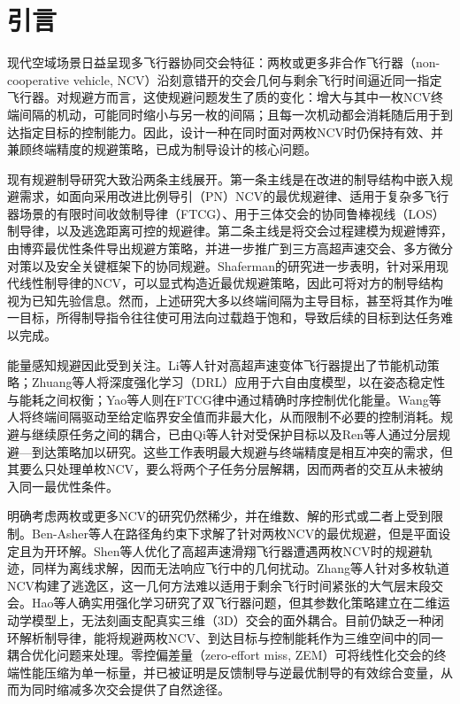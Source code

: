 \section{引言}
现代空域场景日益呈现多飞行器协同交会特征：两枚或更多非合作飞行器（non-cooperative vehicle, NCV）沿刻意错开的交会几何与剩余飞行时间逼近同一指定飞行器\cite{yan2020b,shalumov2019}。对规避方而言，这使规避问题发生了质的变化：增大与其中一枚NCV终端间隔的机动，可能同时缩小与另一枚的间隔；且每一次机动都会消耗随后用于到达指定目标的控制能力。因此，设计一种在同时面对两枚NCV时仍保持有效、并兼顾终端精度的规避策略，已成为制导设计的核心问题。

现有规避制导研究大致沿两条主线展开。第一条主线是在改进的制导结构中嵌入规避需求，如面向采用改进比例导引（PN）NCV的最优规避律\cite{feng2023}、适用于复杂多飞行器场景的有限时间收敛制导律（FTCG）\cite{ding2024}、用于三体交会的协同鲁棒视线（LOS）制导律\cite{luo2023}，以及逃逸距离可控的规避律\cite{yu2023}。第二条主线是将交会过程建模为规避博弈，由博弈最优性条件导出规避方策略\cite{turetsky2003}，并进一步推广到三方高超声速交会\cite{yan2020a}、多方微分对策\cite{liang2022}以及安全关键框架下的协同规避\cite{chen2024}。Shaferman的研究进一步表明，针对采用现代线性制导律的NCV，可以显式构造近最优规避策略\cite{shaferman2021}，因此可将对方的制导结构视为已知先验信息。然而，上述研究大多以终端间隔为主导目标，甚至将其作为唯一目标，所得制导指令往往使可用法向过载趋于饱和，导致后续的目标到达任务难以完成。

能量感知规避因此受到关注。Li等人针对高超声速变体飞行器提出了节能机动策略\cite{li2024cja}；Zhuang等人将深度强化学习（DRL）应用于六自由度模型，以在姿态稳定性与能耗之间权衡\cite{zhuang2024}；Yao等人则在FTCG律中通过精确时序控制优化能量\cite{yao2024}。Wang等人将终端间隔驱动至给定临界安全值而非最大化，从而限制不必要的控制消耗\cite{wang2024}。规避与继续原任务之间的耦合，已由Qi等人针对受保护目标\cite{qi2017}以及Ren等人通过分层规避—到达策略\cite{ren2025}加以研究。这些工作表明最大规避与终端精度是相互冲突的需求，但其要么只处理单枚NCV，要么将两个子任务分层解耦，因而两者的交互从未被纳入同一最优性条件。

明确考虑两枚或更多NCV的研究仍然稀少，并在维数、解的形式或二者上受到限制。Ben-Asher等人在路径角约束下求解了针对两枚NCV的最优规避，但是平面设定且为开环解\cite{benasher1988}。Shen等人优化了高超声速滑翔飞行器遭遇两枚NCV时的规避轨迹，同样为离线求解，因而无法响应飞行中的几何扰动\cite{shen2022}。Zhang等人针对多枚轨道NCV构建了逃逸区，这一几何方法难以适用于剩余飞行时间紧张的大气层末段交会\cite{zhang2023}。Hao等人确实用强化学习研究了双飞行器问题，但其参数化策略建立在二维运动学模型上，无法刻画支配真实三维（3D）交会的面外耦合\cite{hao2025}。目前仍缺乏一种闭环解析制导律，能将规避两枚NCV、到达目标与控制能耗作为三维空间中的同一耦合优化问题来处理。零控偏差量（zero-effort miss, ZEM）可将线性化交会的终端性能压缩为单一标量\cite{zarchan2019}，并已被证明是反馈制导\cite{guo2013}与逆最优制导\cite{ma2022}的有效综合变量，从而为同时缩减多次交会提供了自然途径。

